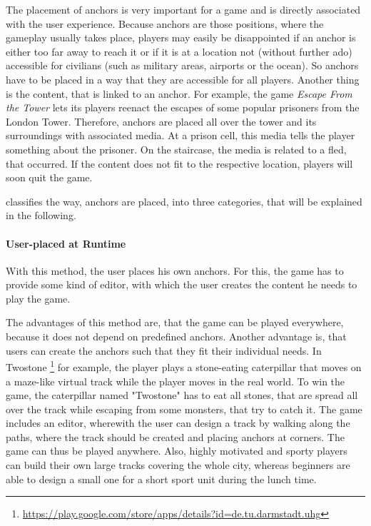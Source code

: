 The placement of anchors is very important for a game and is directly associated with the user experience. Because anchors are those positions, where the gameplay usually takes place, players may easily be disappointed if an anchor is either too far away to reach it or if it is at a location not (without further ado) accessible for civilians (such as military areas, airports or the ocean). So anchors have to be placed in a way that they are accessible for all players.
Another thing is the content, that is linked to an anchor. For example, the game \emph{Escape From the Tower} \citep{EscapeFromTheTower} lets its players reenact the escapes of some popular prisoners from the London Tower. Therefore, anchors are placed all over the tower and its surroundings with associated media. At a prison cell, this media tells the player something about the prisoner. On the staircase, the media is related to a fled, that occurred. If the content does not fit to the respective location, players will soon quit the game.

\citeauthor{reid2008design} classifies the way, anchors are placed, into three categories, that will be explained in the following.

\paragraph{User-placed at Runtime}
With this method, the user places his own anchors. For this, the game has to provide some kind of editor, with which the user creates the content he needs to play the game.

The advantages of this method are, that the game can be played everywhere, because it does not depend on predefined anchors. Another advantage is, that users can create the anchors such that they fit their individual needs. In Twostone \footnote{\url{https://play.google.com/store/apps/details?id=de.tu.darmstadt.uhg}} for example, the player plays a stone-eating caterpillar that moves on a maze-like virtual track while the player moves in the real world. To win the game, the caterpillar named "Twostone" has to eat all stones, that are spread all over the track while escaping from some monsters, that try to catch it. The game includes an editor, wherewith the user can design a track by walking along the paths, where the track should be created and placing anchors at corners. The game can thus be played anywhere. Also, highly motivated and sporty players can build their own large tracks covering the whole city, whereas beginners are able to design a small one for a short sport unit during the lunch time.


